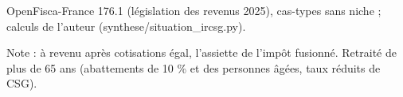 OpenFisca-France 176.1 (législation des revenus 2025), cas-types sans niche ; calculs de l'auteur (synthese/situation\_ircsg.py).\par Note : à revenu après cotisations égal, l'assiette de l'impôt fusionné. Retraité de plus de 65 ans (abattements de 10 \% et des personnes âgées, taux réduits de CSG).
